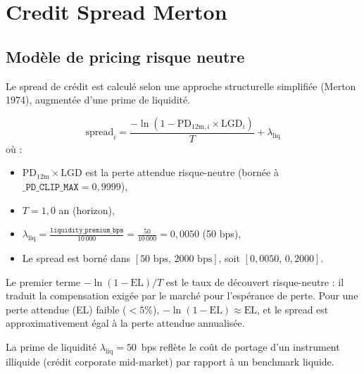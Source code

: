 \documentclass[12pt,a4paper]{article}
\begin{document}
\newpage
\section{Credit Spread Merton}
\label{sec:spread}

\subsection{Mod\`ele de pricing risque neutre}

Le spread de cr\'edit est calcul\'e selon une approche structurelle simplifi\'ee (Merton 1974), augment\'ee d'une prime de liquidit\'e.

\begin{formulebox}
\begin{equation}
\label{eq:spread}
\text{spread}_i = \frac{-\ln\!\left(1 - \text{PD}_{12\text{m},i} \times \text{LGD}_i\right)}{T} + \lambda_{\text{liq}}
\end{equation}
o\`u :
\begin{itemize}
    \item $\text{PD}_{12\text{m}} \times \text{LGD}$ est la perte attendue risque-neutre (born\'ee \`a $\texttt{\_PD\_CLIP\_MAX} = 0{,}9999$),
    \item $T = 1{,}0$ an (horizon),
    \item $\lambda_{\text{liq}} = \frac{\texttt{liquidity\_premium\_bps}}{10\,000} = \frac{50}{10\,000} = 0{,}0050$ (50 bps),
    \item Le spread est born\'e dans $[50\text{ bps},\, 2000\text{ bps}]$, soit $[0{,}0050,\, 0{,}2000]$.
\end{itemize}
\end{formulebox}

\begin{interpretbox}
Le premier terme $-\ln(1 - \text{EL})/T$ est le taux de d\'ecouvert risque-neutre : il traduit la compensation exig\'ee par le march\'e pour l'esp\'erance de perte. Pour une perte attendue (EL) faible ($< 5\%$), $-\ln(1 - \text{EL}) \approx \text{EL}$, et le spread est approximativement \'egal \`a la perte attendue annualis\'ee.

La prime de liquidit\'e $\lambda_{\text{liq}} = 50$~bps refl\`ete le co\^ut de portage d'un instrument illiquide (cr\'edit corporate mid-market) par rapport \`a un benchmark liquide.
\end{interpretbox}
\end{document}
